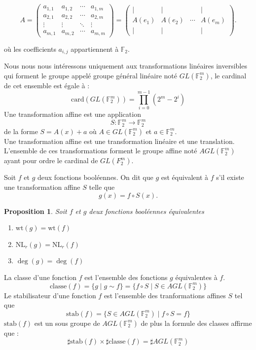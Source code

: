\documentclass{article}
\def\FF{\ensuremath{\mathbb{F}}}
\def\WT#1{\ensuremath{\mathrm{wt}(#1)}}
\def\NL{\ensuremath{\mathrm{NL}}}
\newtheorem{proposition}{Proposition}
\begin{document}
\[
A =
\begin{pmatrix}
a_{1,1} & a_{1,2} & \cdots & a_{1,m} \\
a_{2,1} & a_{2,2} & \cdots & a_{2,m} \\
\vdots & \vdots & \ddots & \vdots \\
a_{m,1} & a_{m,2} & \cdots & a_{m,m}
\end{pmatrix}
= \begin{pmatrix}
\big| & \big| &        & \big| \\
A(e_1) & A(e_2) & \cdots & A(e_m) \\
\big| & \big| &        & \big|
\end{pmatrix}.
\]

où les coefficients \(a_{i,j}\) appartiennent à \(\mathbb{F}_2\).

Nous nous nous intéressons uniquement aux transformations linéaires inversibles qui forment le groupe appelé groupe général linéaire
noté $GL(\FF_2^m)$, le cardinal de cet ensemble est égale à :
$$
\text{card}(GL(\FF_2^m))=\prod_{i=0}^{m-1}(2^m - 2^i)
$$
Une transformation affine est une application
$$
S : \FF_2^m \to \FF_2^m
$$
de la forme
$
S = A(x) + a
$
où
$ A \in GL(\FF_2^m)
$
et
$
a \in \FF_2^m
$. \\
Une transformation affine est une transformation linéaire et une translation. L'ensemble de ces transformations forment le groupe affine noté $AGL(\FF_2^m)$ ayant pour ordre le cardinal de $GL(F_2^m)$.

Soit $f$ et $g$ deux fonctions booléennes. On dit que $g$ est équivalent à $f$ s'il existe une transformation affine $S$ telle que
$$
g(x) = f \circ S(x).
$$
\begin{proposition}
	Soit $f$ et $g$ deux fonctions booléennes équivalentes
	\begin{enumerate}
		\item $\WT{g} = \WT{f}$
		\item $\NL_r(g) = \NL_r(f)$
		\item $\deg(g) = \deg(f)$
	\end{enumerate}
\end{proposition}
La classe d'une fonction $f$ est l'ensemble des fonctions $g$ équivalentes à $f$.
$$
\text{classe}(f) = \{g \mid g\sim f\} = \{f \circ S  \mid  S \in AGL(\FF_2^m)\}
$$
Le stabilisateur d'une fonction $f$ est l'ensemble des tranformations affines $S$ tel que
$$
\text{stab}(f) = \{S \in AGL(\FF_2^m)  \mid  f \circ S = f\}
$$
$\text{stab}(f)$ est un sous groupe de $AGL(\FF_2^m)$ de plus la formule des classes affirme que :
$$
\sharp \text{stab}(f) \times \sharp \text{classe}(f) = \sharp AGL(\FF_2^m)
$$
\end{document}
